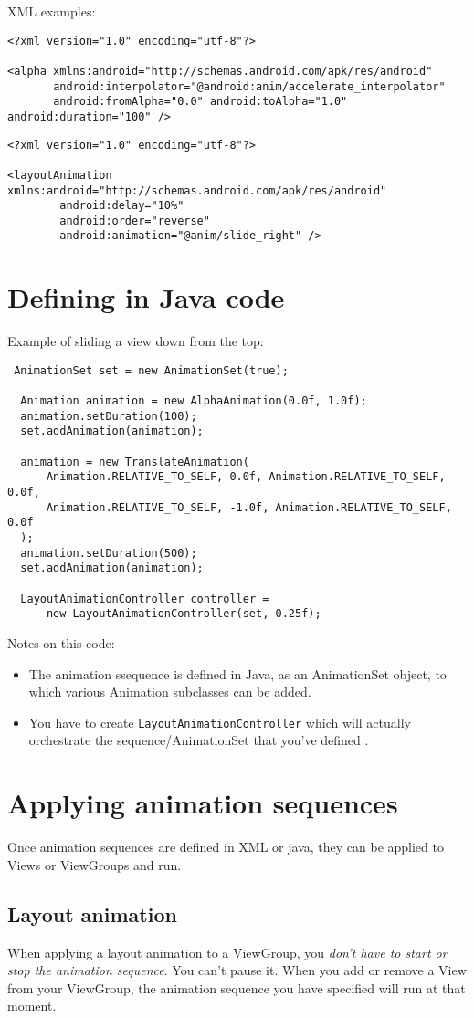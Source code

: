 \documentclass[11pt, a4paper]{book}
\begin{document}
XML examples:
\begin{verbatim}
<?xml version="1.0" encoding="utf-8"?>

<alpha xmlns:android="http://schemas.android.com/apk/res/android"
       android:interpolator="@android:anim/accelerate_interpolator"
       android:fromAlpha="0.0" android:toAlpha="1.0" android:duration="100" />
\end{verbatim}
\begin{verbatim}
<?xml version="1.0" encoding="utf-8"?>

<layoutAnimation xmlns:android="http://schemas.android.com/apk/res/android"
        android:delay="10%"
        android:order="reverse"
        android:animation="@anim/slide_right" />
\end{verbatim}
\section{Defining in Java code}
Example of sliding a view down from the top:
\begin{verbatim}
 AnimationSet set = new AnimationSet(true);

  Animation animation = new AlphaAnimation(0.0f, 1.0f);
  animation.setDuration(100);
  set.addAnimation(animation);

  animation = new TranslateAnimation(
      Animation.RELATIVE_TO_SELF, 0.0f, Animation.RELATIVE_TO_SELF, 0.0f,
      Animation.RELATIVE_TO_SELF, -1.0f, Animation.RELATIVE_TO_SELF, 0.0f
  );
  animation.setDuration(500);
  set.addAnimation(animation);

  LayoutAnimationController controller =
      new LayoutAnimationController(set, 0.25f);
\end{verbatim}
Notes on this code:
\begin{itemize}
\item The animation ssequence is defined in Java, as an AnimationSet object, to
which various Animation subclasses can be added.
\item You have to create \verb|LayoutAnimationController| which will actually
orchestrate the sequence/AnimationSet that you've defined .
\end{itemize}
\section{Applying animation sequences}
Once animation sequences are defined in XML or java, they can be applied to
Views or ViewGroups and run.
\subsection{Layout animation}
When applying a layout animation to a ViewGroup, you \emph{don't have to start
or stop the animation sequence}. You can't pause it. When you add or remove a
View from your ViewGroup, the animation sequence you have specified will run at
that moment.
\end{document}
